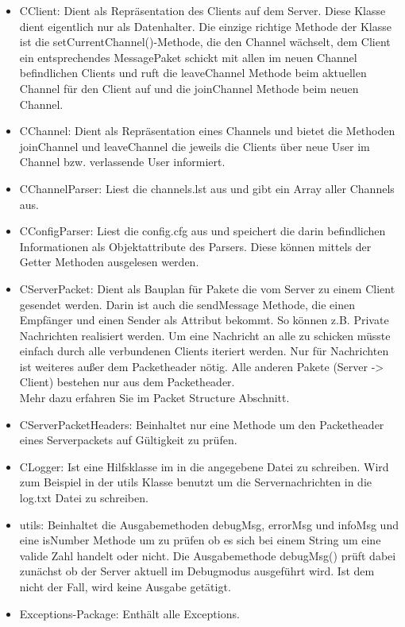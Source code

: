 \documentclass[a4paper,12pt]{scrartcl}
\begin{document}
\begin{itemize}
\item CClient: Dient als Repräsentation des Clients auf dem Server. Diese Klasse dient eigentlich nur als Datenhalter. Die einzige richtige Methode der Klasse ist die setCurrentChannel()-Methode, die den Channel wächselt, dem Client ein entsprechendes MessagePaket schickt mit allen im neuen Channel befindlichen Clients und ruft die leaveChannel Methode beim aktuellen Channel für den Client auf und die joinChannel Methode beim neuen Channel.
\item CChannel: Dient als Repräsentation eines Channels und bietet die Methoden joinChannel und leaveChannel die jeweils die Clients über neue User im Channel bzw. verlassende User informiert.
\item CChannelParser: Liest die channels.lst aus und gibt ein Array aller Channels aus.
\item CConfigParser: Liest die config.cfg aus und speichert die darin befindlichen Informationen als Objektattribute des Parsers. Diese können mittels der Getter Methoden ausgelesen werden.
\item CServerPacket: Dient als Bauplan für Pakete die vom Server zu einem Client gesendet werden. Darin ist auch die sendMessage Methode, die einen Empfänger und einen Sender als Attribut bekommt. So können z.B. Private Nachrichten realisiert werden. Um eine Nachricht an alle zu schicken müsste einfach durch alle verbundenen Clients iteriert werden. Nur für Nachrichten ist weiteres außer dem Packetheader nötig. Alle anderen Pakete (Server -> Client) bestehen nur aus dem Packetheader.\\
Mehr dazu erfahren Sie im Packet Structure Abschnitt.
\item CServerPacketHeaders: Beinhaltet nur eine Methode um den Packetheader eines Serverpackets auf Gültigkeit zu prüfen.
\item CLogger: Ist eine Hilfsklasse im in die angegebene Datei zu schreiben. Wird zum Beispiel in der utils Klasse benutzt um die Servernachrichten in die log.txt Datei zu schreiben.
\item utils: Beinhaltet die Ausgabemethoden debugMsg, errorMsg und infoMsg und eine isNumber Methode um zu prüfen ob es sich bei einem String um eine valide Zahl handelt oder nicht. Die Ausgabemethode debugMsg() prüft dabei zunächst ob der Server aktuell im Debugmodus ausgeführt wird. Ist dem nicht der Fall, wird keine Ausgabe getätigt.
\item Exceptions-Package: Enthält alle Exceptions.


\end{itemize}
\end{document}
